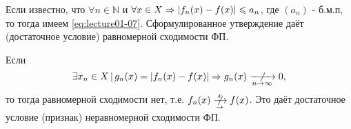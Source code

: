 \begin{notes}
  \item Если известно, что $\forall n \in \mathbb{N}$ и $\forall x \in X \Rightarrow
\left\lvert f_n(x) - f(x) \right\rvert \leqslant a_n$, где $(a_n)$ - б.м.п, то тогда имеем \eqref{eq:lecture01-07}.
Сформулированное утверждение даёт  (достаточное условие)
равномерной сходимости ФП.
\item Если
  \begin{equation*}
	  \exists x_n \in X \,\vert\, g_n(x) = \abs{f_n(x) - f(x)} \Rightarrow g_n(x) \centernot{
	  \xrightarrow[n \to \infty]{}} 0,
  \end{equation*}
  то тогда равномерной сходимости нет, т.е. $f_n(x) \centernot{\xrightarrow[\to]{x}} f(x)$. Это
  даёт достаточное условие (признак) неравномерной сходимости ФП.
\end{notes}
